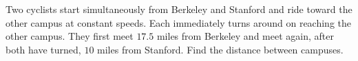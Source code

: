 Two cyclists start simultaneously from Berkeley and Stanford and ride toward the other campus at constant speeds. Each immediately turns around on reaching the other campus. They first meet $17.5$ miles from Berkeley and meet again, after both have turned, $10$ miles from Stanford. Find the distance between campuses.
